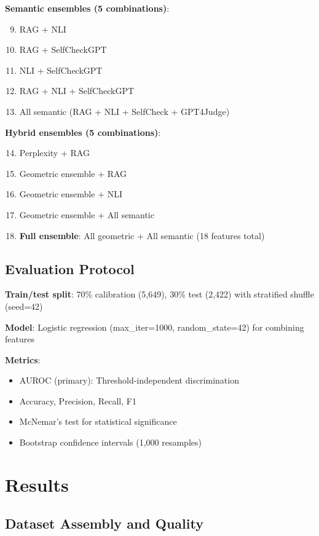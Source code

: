 \documentclass[11pt]{article}
\begin{document}
\textbf{Semantic ensembles (5 combinations)}:
\begin{enumerate}
\setcounter{enumi}{8}
\item RAG + NLI
\item RAG + SelfCheckGPT
\item NLI + SelfCheckGPT
\item RAG + NLI + SelfCheckGPT
\item All semantic (RAG + NLI + SelfCheck + GPT4Judge)
\end{enumerate}

\textbf{Hybrid ensembles (5 combinations)}:
\begin{enumerate}
\setcounter{enumi}{13}
\item Perplexity + RAG
\item Geometric ensemble + RAG
\item Geometric ensemble + NLI
\item Geometric ensemble + All semantic
\item \textbf{Full ensemble}: All geometric + All semantic (18 features total)
\end{enumerate}

\subsection{Evaluation Protocol}

\textbf{Train/test split}: 70\% calibration (5,649), 30\% test (2,422) with stratified shuffle (seed=42)

\textbf{Model}: Logistic regression (max\_iter=1000, random\_state=42) for combining features

\textbf{Metrics}:
\begin{itemize}
\item AUROC (primary): Threshold-independent discrimination
\item Accuracy, Precision, Recall, F1
\item McNemar's test for statistical significance
\item Bootstrap confidence intervals (1,000 resamples)
\end{itemize}

\section{Results}
\label{sec:results}

\subsection{Dataset Assembly and Quality}
\end{document}
